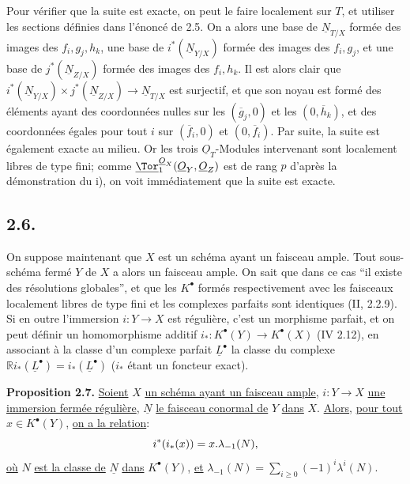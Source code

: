 
Pour vérifier que la suite est exacte, on peut le faire localement sur \(T\), et utiliser les sections définies dans l'énoncé de 2.5. On a alors une base de \(\underline{N}_{T/X}\) formée des images des \(f_i,g_j,h_k\), une base de \(i^*(\underline{N}_{Y/X})\) formée des images des \(f_i,g_j\), et une base de \(j^*(\underline{N}_{Z/X})\) formée des images des \(f_i,h_k\). Il est alors clair que \(i^*(\underline{N}_{Y/X})\times j^*(\underline{N}_{Z/X})\to \underline{N}_{T/X}\) est surjectif, et que son noyau est formé des éléments ayant des coordonnées nulles sur les \((\overline g_j,0)\) et les \((0,\overline h_k)\), et des coordonnées égales pour tout \(i\) sur \((\overline f_i,0)\) et \((0,\overline f_i)\). Par suite, la suite est également exacte au milieu. Or les trois \(\underline{O}_T\)-Modules intervenant sont localement libres de type fini; comme \(\underline{\Tor}_1^{\underline{O}_X}(\underline{O}_Y,\underline{O}_Z)\) est de rang \(p\) d'après la démonstration du i), on voit immédiatement que la suite est exacte.

\subsection*{2.6.}
On suppose maintenant que \(X\) est un schéma ayant un faisceau ample. Tout sous-schéma fermé \(Y\) de \(X\) a alors un faisceau ample. On sait que dans ce cas ``il existe des résolutions globales'', et que les \(K^{\bullet}\) formés respectivement avec les faisceaux localement libres de type fini et les complexes parfaits sont identiques (II, 2.2.9). Si en outre l'immersion \(i:Y\to X\) est régulière, c'est un morphisme parfait, et on peut définir un homomorphisme additif \(i_*:K^{\bullet}(Y)\longrightarrow K^{\bullet}(X)\) (IV 2.12), en associant à la classe d'un complexe parfait \(\underline{L}^\bullet\) la classe du complexe \(\mathbb Ri_*(\underline{L}^\bullet)=i_*(\underline{L}^\bullet)\) (\(i_*\) étant un foncteur exact).

\textbf{Proposition 2.7.} \uline{Soient} \(X\) \uline{un schéma ayant un faisceau ample}, \(i:Y\to X\) \uline{une immersion fermée régulière}, \(\underline{N}\) \uline{le faisceau conormal de} \(Y\) \uline{dans} \(X\). \uline{Alors}, \uline{pour tout} \(x\in K^{\bullet}(Y)\), \uline{on a la relation}:
\begin{equation}\notag
i^*(i_*(x))=x.\lambda_{-1}(N),
\end{equation}
\uline{où} \(N\) \uline{est la classe de} \(\underline{N}\) \uline{dans} \(K^{\bullet}(Y)\), \uline{et} \(\lambda_{-1}(N)=\sum_{i\ge0}(-1)^i\lambda^i(N)\).



